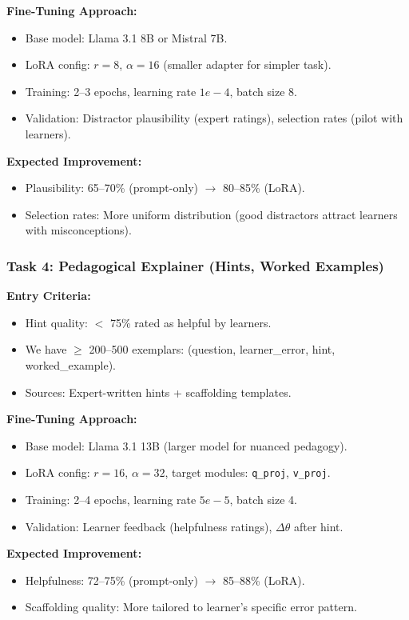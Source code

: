 \documentclass[11pt,letterpaper]{article}
\begin{document}
\textbf{Fine-Tuning Approach:}
\begin{itemize}
\item Base model: Llama 3.1 8B or Mistral 7B.
\item LoRA config: $r=8$, $\alpha=16$ (smaller adapter for simpler task).
\item Training: 2--3 epochs, learning rate $1e-4$, batch size 8.
\item Validation: Distractor plausibility (expert ratings), selection rates (pilot with learners).
\end{itemize}

\textbf{Expected Improvement:}
\begin{itemize}
\item Plausibility: 65--70\% (prompt-only) $\rightarrow$ 80--85\% (LoRA).
\item Selection rates: More uniform distribution (good distractors attract learners with misconceptions).
\end{itemize}

\subsubsection{Task 4: Pedagogical Explainer (Hints, Worked Examples)}

\textbf{Entry Criteria:}
\begin{itemize}
\item Hint quality: $<$ 75\% rated as helpful by learners.
\item We have $\geq$ 200--500 exemplars: (question, learner\_error, hint, worked\_example).
\item Sources: Expert-written hints + scaffolding templates.
\end{itemize}

\textbf{Fine-Tuning Approach:}
\begin{itemize}
\item Base model: Llama 3.1 13B (larger model for nuanced pedagogy).
\item LoRA config: $r=16$, $\alpha=32$, target modules: \texttt{q\_proj}, \texttt{v\_proj}.
\item Training: 2--4 epochs, learning rate $5e-5$, batch size 4.
\item Validation: Learner feedback (helpfulness ratings), $\Delta\theta$ after hint.
\end{itemize}

\textbf{Expected Improvement:}
\begin{itemize}
\item Helpfulness: 72--75\% (prompt-only) $\rightarrow$ 85--88\% (LoRA).
\item Scaffolding quality: More tailored to learner's specific error pattern.
\end{itemize}
\end{document}

